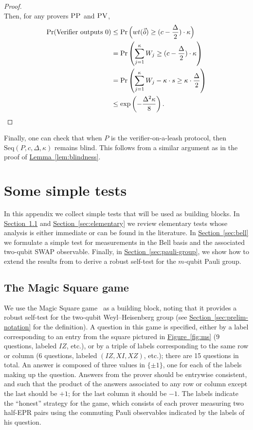 \documentclass[11pt]{article}
\numberwithin{equation}{section}
\theoremstyle{definition}
\theoremstyle{plain}
\newcommand{\expref}[2]{\hyperref[#2]{#1~\ref{#2}}}
\newcommand{\pv}{\textsc{PV}}
\newcommand{\pp}{\textsc{PP}}
\begin{document}
\begin{proof}
\begin{equation*}
\end{equation*}
Then, for any provers $\pp$ and $\pv$,
\begin{align*}
\Pr(\mbox{Verifier outputs $0$}) &\leq \Pr \Big(wt(\vec{\tilde{o}}) \geq (c - \frac{\Delta}{2})\cdot \kappa \Big) \\
&= \Pr \left(\sum_{j=1}^\kappa W_j \geq (c - \frac{\Delta}{2})\cdot \kappa \right) \\
&= \Pr \left(\sum_{j=1}^{\kappa} W_j - \kappa \cdot s \geq \kappa \cdot \frac{\Delta}{2} \right) \\
&\leq \exp \left(-\frac{\Delta^2\kappa}{8}\right). \qedhere
\end{align*}
\end{proof}
 Finally, one can check that when $P$ is the verifier-on-a-leash protocol, then $\mbox{Seq}(P,c,\Delta, \kappa)$ remains blind. This follows from a similar argument as in the proof of \expref{Lemma}{lem:blindness}.
 
 
 
 
 
\appendix
\appendix




\section{Some simple tests}
\label{sec:clifford-test}


In this appendix we collect simple tests that will be used as building blocks. In \expref{Section}{sec:ms} and \expref{Section}{sec:elementary} we review elementary tests whose analysis is either immediate or can be found in the literature. In \expref{Section}{sec:bell} we formulate a simple test for measurements in the Bell basis and the associated two-qubit SWAP observable. 
Finally, in \expref{Section}{sec:pauli-group}, we show how to extend the results from \cite{natarajan2016robust} to derive a robust self-test for the $m$-qubit Pauli group. 


\subsection{The Magic Square game}
\label{sec:ms}

We use the Magic Square game~\cite{Mermin90} as a building block, noting that it  provides a robust self-test for the two-qubit Weyl--Heisenberg group (see \expref{Section}{sec:prelim-notation} for the definition). A question in this game is specified, either by a label corresponding to an entry from the square pictured in \expref{Figure}{fig:ms} ($9$ questions, labeled $IZ$, etc.), or by a triple of labels corresponding to the same row or column ($6$ questions, labeled $(IZ,XI,XZ)$, etc.); there are 15 questions in total. An answer is composed of three values in $\{\pm 1\}$, one for each of the labels making up the question. Answers from the prover should be entrywise consistent, and such that the product of the answers associated to any row or column except the last should be $+1$; for the last column it should be $-1$. The labels indicate the ``honest'' strategy for the game, which consists of each prover measuring two half-EPR pairs using the commuting Pauli observables indicated by the labels of his question. 
\end{document}
